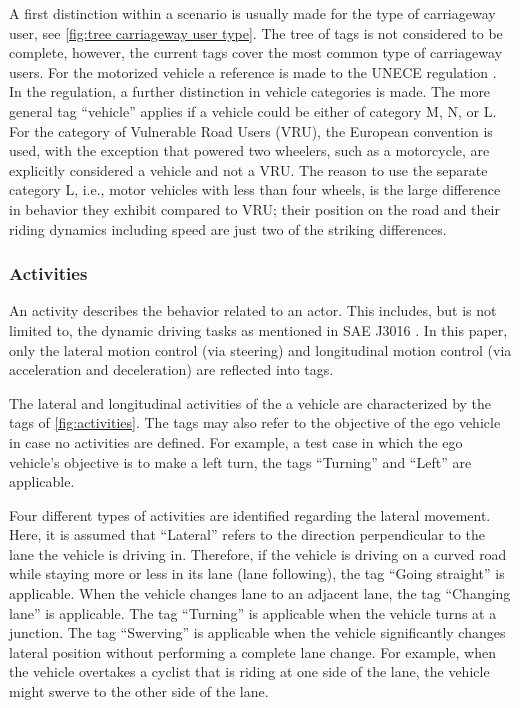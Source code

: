 A first distinction within a scenario is usually made for the type of carriageway user, see \cref{fig:tree carriageway user type}. The tree of tags is not considered to be complete, however, the current tags cover the most common type of carriageway users. For the motorized vehicle a reference is made to the UNECE regulation \autocite{UNECE2011consolidated}. In the regulation, a further distinction in vehicle categories is made. The more general tag ``vehicle'' applies if a vehicle could be either of category M, N, or L. For the category of Vulnerable Road Users (VRU), the European convention is used, with the exception that powered two wheelers, such as a motorcycle, are explicitly considered a vehicle and not a VRU. The reason to use the separate category L, i.e., motor vehicles with less than four wheels, is the large difference in behavior they exhibit compared to VRU; their position on the road and their riding dynamics including speed are just two of the striking differences. 



\subsubsection{Activities}
\label{sec:activities}

An activity describes the behavior related to an actor. This includes, but is not limited to, the dynamic driving tasks as mentioned in SAE J3016 \cite{sae2018j3016}. In this paper, only the lateral motion control (via steering) and longitudinal motion control (via acceleration and deceleration) are reflected into tags.

The lateral and longitudinal activities of the a vehicle are characterized by the tags of \cref{fig:activities}. The tags may also refer to the objective of the ego vehicle in case no activities are defined. For example, a test case in which the ego vehicle's objective is to make a left turn, the tags ``Turning'' and ``Left'' are applicable. 


Four different types of activities are identified regarding the lateral movement. Here, it is assumed that ``Lateral'' refers to the direction perpendicular to the lane the vehicle is driving in. Therefore, if the vehicle is driving on a curved road while staying more or less in its lane (lane following), the tag ``Going straight'' is applicable. When the vehicle changes lane to an adjacent lane, the tag ``Changing lane'' is applicable. The tag ``Turning'' is applicable when the vehicle turns at a junction. The tag ``Swerving'' is applicable when the vehicle significantly changes lateral position without performing a complete lane change. For example, when the vehicle overtakes a cyclist that is riding at one side of the lane, the vehicle might swerve to the other side of the lane. 

